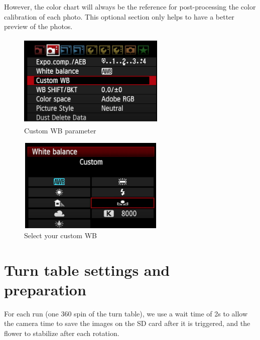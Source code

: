 \documentclass[
]{book}
\theoremstyle{definition}
\theoremstyle{definition}
\theoremstyle{definition}
\theoremstyle{definition}
\theoremstyle{remark}
\begin{document}
However, the color chart will always be the reference for
post-processing the color calibration of each photo. This optional
section only helps to have a better preview of the photos.

\begin{figure}
\hypertarget{WB_sub1}{%
\centering
\includegraphics[width=7cm,height=4.5cm]{Figures/Custom WB setting.png}
\caption{Custom WB parameter}\label{WB_sub1}
}
\end{figure}

\begin{figure}
\hypertarget{WB_sub2}{%
\centering
\includegraphics[width=7cm,height=4.5cm]{Figures/Custom WB selection.png}
\caption{Select your custom WB}\label{WB_sub2}
}
\end{figure}

\hypertarget{turn-table-settings-and-preparation}{%
\section{Turn table settings and preparation}\label{turn-table-settings-and-preparation}}

For each run (one 360 spin of the turn table), we use a wait time of 2s
to allow the camera time to save the images on the SD card after it is
triggered, and the flower to stabilize after each rotation.
\end{document}
